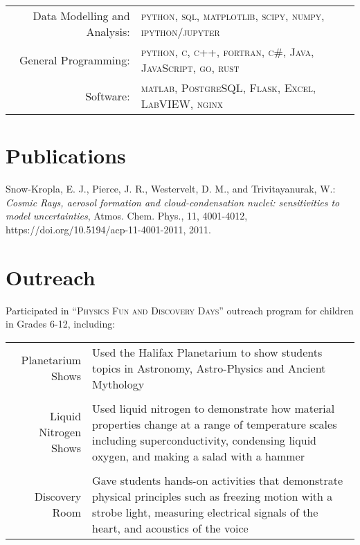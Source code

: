 \documentclass[a4paper,11pt]{article} %
\begin{document}
\begin{tabular}{rl}

Data Modelling and Analysis: & \textsc{python}, \textsc{sql}, \textsc{matplotlib}, \textsc{scipy}, \textsc{numpy}, \textsc{ipython/jupyter} \\

General Programming: & \textsc{python}, \textsc{c}, \textsc{c++}, \textsc{fortran}, \textsc{c\#}, \textsc{Java}, \textsc{JavaScript}, \textsc{go}, \textsc{rust} \\

Software: & \textsc{matlab}, \textsc{PostgreSQL}, \textsc{Flask}, \textsc{Excel}, \textsc{LabVIEW}, \textsc{nginx} \\
\end{tabular}


\section{Publications}
Snow-Kropla, E. J., Pierce, J. R., Westervelt, D. M., and Trivitayanurak, W.: \emph{Cosmic Rays, aerosol formation and cloud-condensation nuclei: sensitivities to model uncertainties}, Atmos. Chem. Phys., 11, 4001-4012, https://doi.org/10.5194/acp-11-4001-2011, 2011.


\section{Outreach}
Participated in \textsc{``Physics Fun and Discovery Days''} outreach program for children in Grades 6-12, including:\\

\begin{tabular}{r|p{11cm}}

Planetarium Shows & Used the Halifax Planetarium to show students topics in Astronomy, Astro-Physics and Ancient Mythology \\
\multicolumn{2}{c}{} \\

Liquid Nitrogen Shows & Used liquid nitrogen to demonstrate how material properties change at a range of temperature scales including superconductivity, condensing liquid oxygen, and making a salad with a hammer\\
\multicolumn{2}{c}{} \\

Discovery Room & Gave students hands-on activities that demonstrate physical principles such as freezing motion with a strobe light, measuring electrical signals of the heart, and acoustics of the voice \\

\end{tabular}
\end{document}
